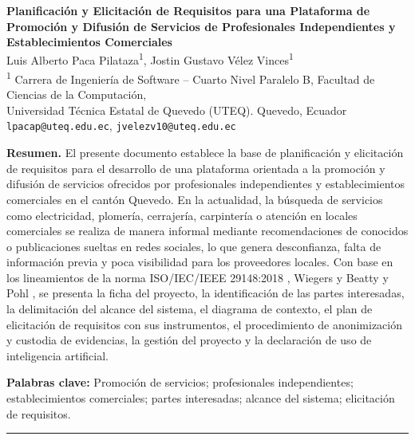 \documentclass[11pt,a4paper]{article}
\begin{document}
\begin{center}
    {\Large \textbf{Planificaci\'on y Elicitaci\'on de Requisitos para una Plataforma de Promoci\'on y Difusi\'on de Servicios de Profesionales Independientes y Establecimientos Comerciales}} \\[8pt]
    
    {\normalsize Luis Alberto Paca Pilataza\textsuperscript{1}, Jostin Gustavo V\'elez Vinces\textsuperscript{1}} \\[4pt]
    {\small \textsuperscript{1} Carrera de Ingenier\'ia de Software -- Cuarto Nivel Paralelo B, Facultad de Ciencias de la Computaci\'on, \\
    Universidad T\'ecnica Estatal de Quevedo (UTEQ). Quevedo, Ecuador \\
    \texttt{lpacap@uteq.edu.ec}, \texttt{jvelezv10@uteq.edu.ec}}
\end{center}

\vspace{4pt}

\noindent\textbf{Resumen.} El presente documento establece la base de planificaci\'on y elicitaci\'on de requisitos para el desarrollo de una plataforma orientada a la promoci\'on y difusi\'on de servicios ofrecidos por profesionales independientes y establecimientos comerciales en el cant\'on Quevedo. En la actualidad, la b\'usqueda de servicios como electricidad, plomer\'ia, cerrajer\'ia, carpinter\'ia o atenci\'on en locales comerciales se realiza de manera informal mediante recomendaciones de conocidos o publicaciones sueltas en redes sociales, lo que genera desconfianza, falta de informaci\'on previa y poca visibilidad para los proveedores locales. Con base en los lineamientos de la norma ISO/IEC/IEEE 29148:2018 \cite{iso29148}, Wiegers y Beatty \cite{wiegers2013} y Pohl \cite{pohl2025}, se presenta la ficha del proyecto, la identificaci\'on de las partes interesadas, la delimitaci\'on del alcance del sistema, el diagrama de contexto, el plan de elicitaci\'on de requisitos con sus instrumentos, el procedimiento de anonimizaci\'on y custodia de evidencias, la gesti\'on del proyecto y la declaraci\'on de uso de inteligencia artificial.

\noindent\textbf{Palabras clave:} Promoci\'on de servicios; profesionales independientes; establecimientos comerciales; partes interesadas; alcance del sistema; elicitaci\'on de requisitos.

\vspace{4pt}
\hrule
\vspace{6pt}
\end{document}

